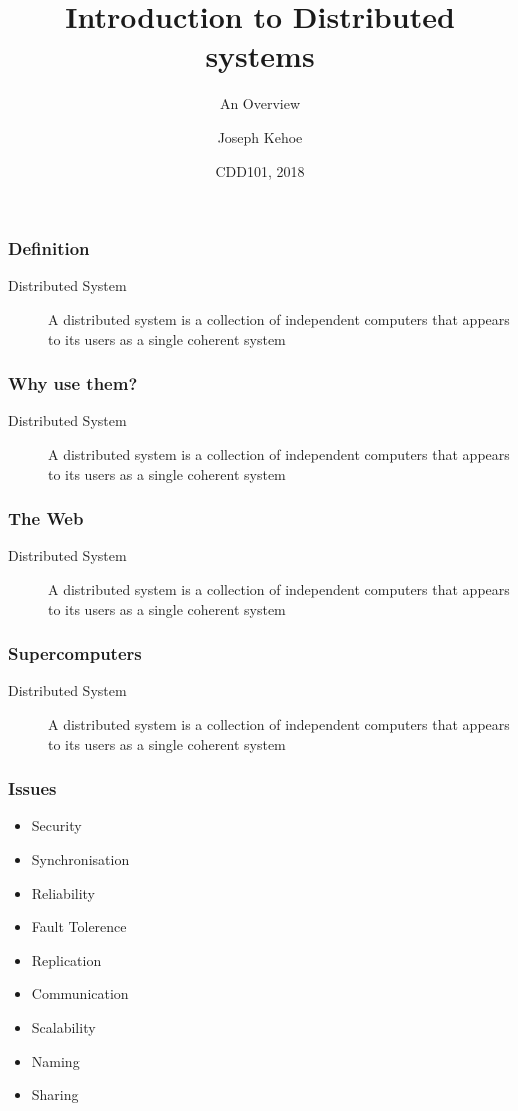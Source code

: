 \documentclass{beamer}
\title[Distributed Systems] %
{Introduction to Distributed systems}
\subtitle{An Overview}
\author[Dr. Joseph Kehoe] %
{Joseph Kehoe\inst{1}}
\institute[IT Carlow] %
{
	\inst{1}%
	Department of Computing and Networking\\
	Institute of Technology Carlow
}
\date[ITC 2018] %
{CDD101, 2018}
\begin{document}
 
\frame{\titlepage}
 
 
 


  \begin{frame}
  	\frametitle{Definition}
  	\begin{description}
  		\item[Distributed System] A distributed system is a collection of independent computers that appears to its users as a single coherent system
  	\end{description}
  \end{frame}
  \begin{frame}
  	\frametitle{Why use them?}
  	\begin{description}
  		\item[Distributed System] A distributed system is a collection of independent computers that appears to its users as a single coherent system
  	\end{description}
  \end{frame}
  \begin{frame}
  	\frametitle{The Web}
  	\begin{description}
  		\item[Distributed System] A distributed system is a collection of independent computers that appears to its users as a single coherent system
  	\end{description}
  \end{frame}
    \begin{frame}
    	\frametitle{Supercomputers}
    	\begin{description}
    		\item[Distributed System] A distributed system is a collection of independent computers that appears to its users as a single coherent system
    	\end{description}
    \end{frame}
  \begin{frame}
  	\frametitle{Issues}
  	\begin{itemize}
  		\item Security
  		\item Synchronisation
  		\item Reliability
  		\item Fault Tolerence
  		\item Replication
  		\item Communication
  		\item Scalability
  		\item Naming
  		\item Sharing
  	\end{itemize}
  \end{frame}
\end{document}
